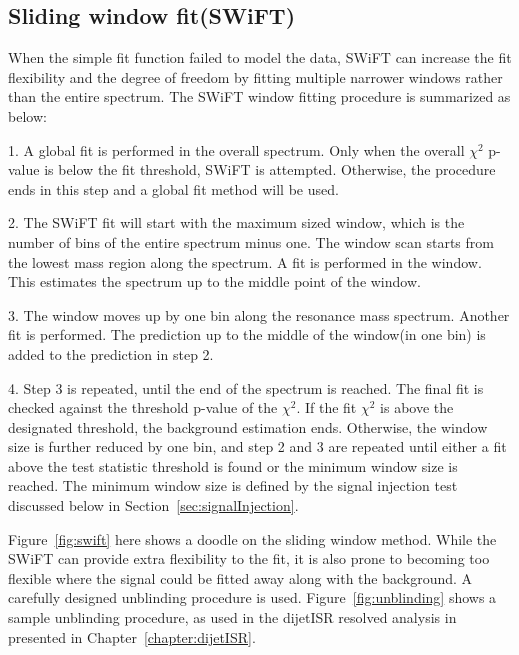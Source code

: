     \subsection{Sliding window fit(SWiFT)}
    When the simple fit function failed to model the data, SWiFT can increase the fit flexibility and the degree of freedom by fitting multiple narrower windows rather than the entire spectrum. The SWiFT window fitting procedure is summarized as below:
    
    1. A global fit is performed in the overall spectrum. Only when the overall $\chi^{2}$ p-value is below the fit threshold, SWiFT is attempted. Otherwise, the procedure ends in this step and a global fit method will be used. 

    2. The SWiFT fit will start with the maximum sized window, which is the number of bins of the entire spectrum minus one. The window scan starts from the lowest mass region along the spectrum. A fit is performed in the window. This estimates the spectrum up to the middle point of the window.

    3. The window moves up by one bin along the resonance mass spectrum. Another fit is performed. The prediction up to the middle of the window(in one bin) is added to the prediction in step 2. 

    4. Step 3 is repeated, until the end of the spectrum is reached. The final fit is checked against the threshold p-value of the $\chi^{2}$. If the fit $\chi^{2}$ is above the designated threshold, the background estimation ends. Otherwise, the window size is further reduced by one bin, and step 2 and 3 are repeated until either a fit above the test statistic threshold is found or the minimum window size is reached. The minimum window size is defined by the signal injection test discussed
    below in Section~\ref{sec:signalInjection}.

    Figure~\ref{fig:swift} here shows a doodle on the sliding window method.
    While the SWiFT can provide extra flexibility to the fit, it is also prone to becoming too flexible where the signal could be fitted away along with the background. A carefully designed unblinding procedure is used. Figure~\ref{fig:unblinding} shows a sample unblinding procedure, as used in the dijetISR resolved analysis in presented in Chapter~\ref{chapter:dijetISR}.

